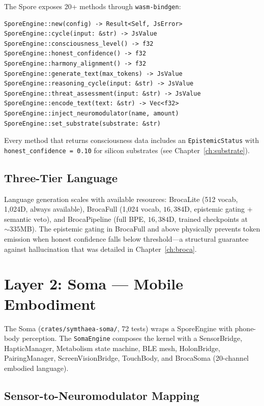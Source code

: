 \documentclass[12pt]{book}
\newcommand{\dimHDC}{16{,}384}
\begin{document}
The Spore exposes 20+ methods through \texttt{wasm-bindgen}:

\begin{lstlisting}[caption={Spore WASM API surface (abbreviated).},label=lst:spore-api]
SporeEngine::new(config) -> Result<Self, JsError>
SporeEngine::cycle(input: &str) -> JsValue
SporeEngine::consciousness_level() -> f32
SporeEngine::honest_confidence() -> f32
SporeEngine::harmony_alignment() -> f32
SporeEngine::generate_text(max_tokens) -> JsValue
SporeEngine::reasoning_cycle(input: &str) -> JsValue
SporeEngine::threat_assessment(input: &str) -> JsValue
SporeEngine::encode_text(text: &str) -> Vec<f32>
SporeEngine::inject_neuromodulator(name, amount)
SporeEngine::set_substrate(substrate: &str)
\end{lstlisting}

Every method that returns consciousness data includes an \texttt{EpistemicStatus} with \texttt{honest\_confidence = 0.10} for silicon substrates (see Chapter~\ref{ch:substrate}).

\subsection{Three-Tier Language}

Language generation scales with available resources: BrocaLite (512 vocab, 1,024D, always available), BrocaFull (1,024 vocab, $\dimHDC$D, epistemic gating + semantic veto), and BrocaPipeline (full BPE, $\dimHDC$D, trained checkpoints at ${\sim}335$MB). The epistemic gating in BrocaFull and above physically prevents token emission when honest confidence falls below threshold---a structural guarantee against hallucination that was detailed in Chapter~\ref{ch:broca}.

\section{Layer 2: Soma --- Mobile Embodiment}

The Soma (\texttt{crates/symthaea-soma/}, 72 tests) wraps a SporeEngine with phone-body perception. The \texttt{SomaEngine} composes the kernel with a SensorBridge, HapticManager, Metabolism state machine, BLE mesh, HolonBridge, PairingManager, ScreenVisionBridge, TouchBody, and BrocaSoma (20-channel embodied language).

\subsection{Sensor-to-Neuromodulator Mapping}
\end{document}
